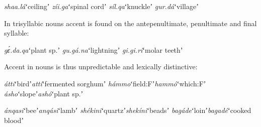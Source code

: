 \documentclass[output=paper,modfonts,nonflat,hidelinks]{langsci/langscibook}
\begin{document}
\begin{exe}
	\ex \label{ex:Petrollino:lexicalstress} \begin{xlist}
	\ex \textit{shaa.lá}\hspace{7mm}ʻceilingʼ
    \ex \textit{zíi.ga}\hspace{10mm}ʻspinal cordʼ
    \ex \textit{síl.qa}\hspace{10mm}ʻknuckleʼ
    \ex \textit{gur.dá}\hspace{9mm}ʻvillageʼ
    \end{xlist}
\end{exe}
In trisyllabic nouns accent is found on the antepenultimate, penultimate and final syllable:

\begin{exe}
	\ex \begin{xlist}
	\ex \textit{gɛ́.da.qa}\hspace{4mm}ʻplant sp.ʼ
    \ex \textit{gu.gá.na}\hspace{4mm}ʻlightningʼ
    \ex \textit{gi.gi.rí}\hspace{7mm}ʻmolar teethʼ
    \end{xlist}
\end{exe}
Accent in nouns is thus unpredictable and lexically distinctive: 

\begin{exe}
	\ex \begin{xlist}
	\ex \textit{átti}\hspace{12mm}ʻbirdʼ\hspace{10mm}\textit{attí}\hspace{10mm}ʻfermented sorghumʼ
    \ex \textit{hámmo}\hspace{6mm}ʻfield:Fʼ\hspace{6mm}\textit{hammó}\hspace{5mm}ʻwhich:Fʼ
    \ex \textit{ásho}\hspace{11mm}ʻslopeʼ\hspace{8mm}\textit{ashó}\hspace{9mm}ʻplant sp.ʼ
\end{xlist} \label{ex:Petrollino:minimalpairs1}
\end{exe}

\begin{exe}
	\ex \begin{xlist}
	\ex \textit{ánqasi}\hspace{8mm}ʻbeeʼ\hspace{11mm}\textit{anqási}\hspace{6mm}ʻlambʼ
    \ex \textit{shékini}\hspace{8mm}ʻquartzʼ\hspace{6mm}\textit{shekíni}\hspace{5mm}ʻbeadsʼ
    \ex \textit{bagáde}\hspace{8mm}ʻloinʼ\hspace{10mm}\textit{bagadé}\hspace{5mm}ʻcooked bloodʼ
\end{xlist} \label{ex:Petrollino:minimalpairs2}
\end{exe}
\end{document}
